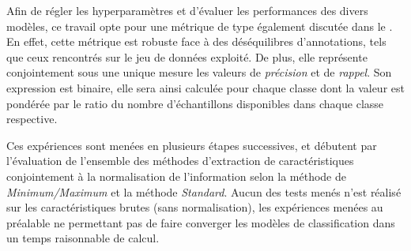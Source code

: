 Afin de régler les hyperparamètres et d'évaluer les performances des divers modèles, ce travail opte pour une métrique de type \fscore{} également discutée dans le . En effet, cette métrique est robuste face à des déséquilibres d'annotations, tels que ceux rencontrés sur le jeu de données exploité. De plus, elle représente conjointement sous une unique mesure les valeurs de \textit{précision} et de \textit{rappel}. Son expression est binaire, elle sera ainsi calculée pour chaque classe dont la valeur est pondérée par le ratio du nombre d'échantillons disponibles dans chaque classe respective.\par

Ces expériences sont menées en plusieurs étapes successives, et débutent par l'évaluation de l'ensemble des méthodes d'extraction de caractéristiques conjointement à la normalisation de l'information selon la méthode de \textit{Minimum/Maximum} et la méthode \textit{Standard}. Aucun des tests menés n'est réalisé sur les caractéristiques brutes (sans normalisation), les expériences menées au préalable ne permettant pas de faire converger les modèles de classification dans un temps raisonnable de calcul.\par
 
